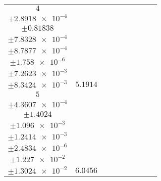 \documentclass[8pt]{article}
\begin{document}
\begin{longtable}[l]{c c c c c c c c c}
$\num{4}$ & \begin{tabular}[c]{@{}c@{}}$\num{2.4054e-2}$ \\ $\pm\num{2.8918e-4}$\end{tabular} & \begin{tabular}[c]{@{}c@{}}$\num{-0.47573}$ \\ $\pm\num{0.81838}$\end{tabular} & \begin{tabular}[c]{@{}c@{}}$\num{-3.3271}$ \\ $\pm\num{7.8328e-4}$\end{tabular} & \begin{tabular}[c]{@{}c@{}}$\num{4.0417e+3}$ \\ $\pm\num{8.7877e-4}$\end{tabular} & \begin{tabular}[c]{@{}c@{}}$\num{8.0856}$ \\ $\pm\num{1.758e-6}$\end{tabular} & \begin{tabular}[c]{@{}c@{}}$\num{0.56113}$ \\ $\pm\num{7.2623e-3}$\end{tabular} & \begin{tabular}[c]{@{}c@{}}$\num{0.46019}$ \\ $\pm\num{8.3424e-3}$\end{tabular} & $\num{5.1914}$\\
$\num{5}$ & \begin{tabular}[c]{@{}c@{}}$\num{2.4332e-2}$ \\ $\pm\num{4.3607e-4}$\end{tabular} & \begin{tabular}[c]{@{}c@{}}$\num{0.58073}$ \\ $\pm\num{1.4024}$\end{tabular} & \begin{tabular}[c]{@{}c@{}}$\num{3.3265}$ \\ $\pm\num{1.096e-3}$\end{tabular} & \begin{tabular}[c]{@{}c@{}}$\num{4.0483e+3}$ \\ $\pm\num{1.2414e-3}$\end{tabular} & \begin{tabular}[c]{@{}c@{}}$\num{8.0989}$ \\ $\pm\num{2.4834e-6}$\end{tabular} & \begin{tabular}[c]{@{}c@{}}$\num{0.56465}$ \\ $\pm\num{1.227e-2}$\end{tabular} & \begin{tabular}[c]{@{}c@{}}$\num{0.49045}$ \\ $\pm\num{1.3024e-2}$\end{tabular} & $\num{6.0456}$\\

\end{longtable}
\end{document}
